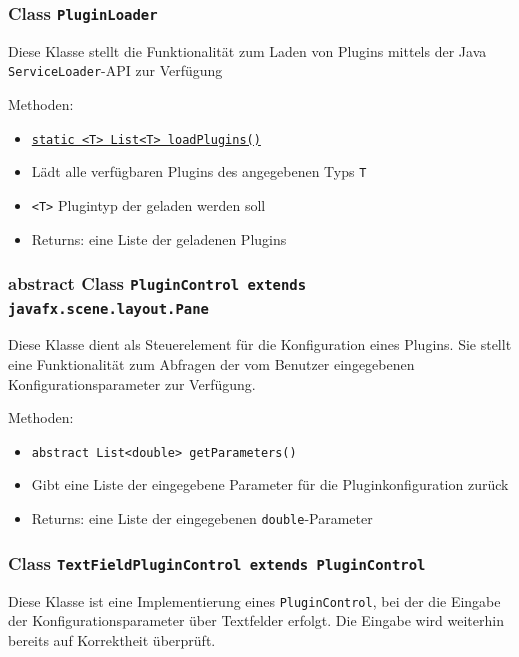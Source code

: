 \documentclass[parskip=full,11pt]{scrartcl}
\begin{document}
\subsubsection{Class \texttt{PluginLoader}}

Diese Klasse stellt die Funktionalität zum Laden von Plugins mittels der Java \texttt{ServiceLoader}-API zur Verfügung

Methoden:

\begin{itemize}\itemsep -10pt
	\item \underline{\texttt{static <T> List<T> loadPlugins()}}
	\item[] Lädt alle verfügbaren Plugins des angegebenen Typs \texttt{T}
	\item[] \texttt{<T>} Plugintyp der geladen werden soll
	\item[]Returns: eine Liste der geladenen Plugins
\end{itemize}

\subsubsection{abstract Class \texttt{PluginControl extends javafx.scene.layout.Pane}}

Diese Klasse dient als Steuerelement für die Konfiguration eines Plugins. Sie stellt eine Funktionalität zum Abfragen der vom Benutzer eingegebenen Konfigurationsparameter zur Verfügung.

Methoden:

\begin{itemize}\itemsep -10pt
	\item \texttt{abstract List<double> getParameters()}
	\item[] Gibt eine Liste der eingegebene Parameter für die Pluginkonfiguration zurück
	\item[] Returns: eine Liste der eingegebenen \texttt{double}-Parameter
\end{itemize}

\subsubsection{Class \texttt{TextFieldPluginControl extends PluginControl}}

Diese Klasse ist eine Implementierung eines  \texttt{PluginControl}, bei der die Eingabe der Konfigurationsparameter über Textfelder erfolgt. Die Eingabe wird weiterhin bereits auf Korrektheit überprüft.
\end{document}
